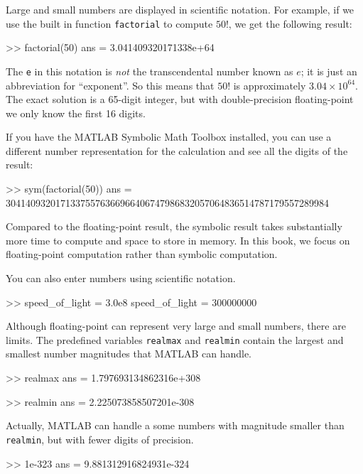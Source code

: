 \documentclass[
]{book}
\numberwithin{Answer}{chapter}
\numberwithin{Exercise}{chapter}
\begin{document}

Large and small numbers are displayed in scientific notation.  For example, if we use the built in function {\tt factorial} to compute $50!$, we get the following result:

\begin{code}
>> factorial(50)
ans = 3.041409320171338e+64
\end{code}

The {\tt e} in this notation is {\em not} the transcendental number
known as $e$; it is just an abbreviation for ``exponent''.  So
this means that $50!$ is approximately $3.04 \times 10^{64}$.  The
exact solution is a 65-digit integer, but with double-precision floating-point 
we only know the first 16 digits.

If you have the MATLAB Symbolic Math Toolbox installed, you can use a 
different number representation for the calculation and see all the digits of 
the result:

\begin{code}
>> sym(factorial(50))
ans = 30414093201713375576366966406747986832057064836514787179557289984
\end{code}

Compared to the floating-point result, the symbolic result takes substantially more time to compute and space to store in memory.
In this book, we focus on floating-point computation rather than symbolic computation.

You can also enter numbers using scientific notation.

\begin{code}
>> speed_of_light = 3.0e8
speed_of_light = 300000000
\end{code}

Although floating-point can represent very large and small numbers, 
there are limits.  
The predefined variables {\tt realmax} and {\tt realmin}
 contain the
largest and smallest number magnitudes that MATLAB 
can handle.

\begin{code}
>> realmax
ans = 1.797693134862316e+308

>> realmin
ans = 2.225073858507201e-308
\end{code}

Actually, MATLAB can handle a some numbers with magnitude smaller than 
{\tt realmin}, but with fewer digits of precision.

\begin{code}
>> 1e-323
ans = 9.881312916824931e-324
\end{code}
\end{document}
